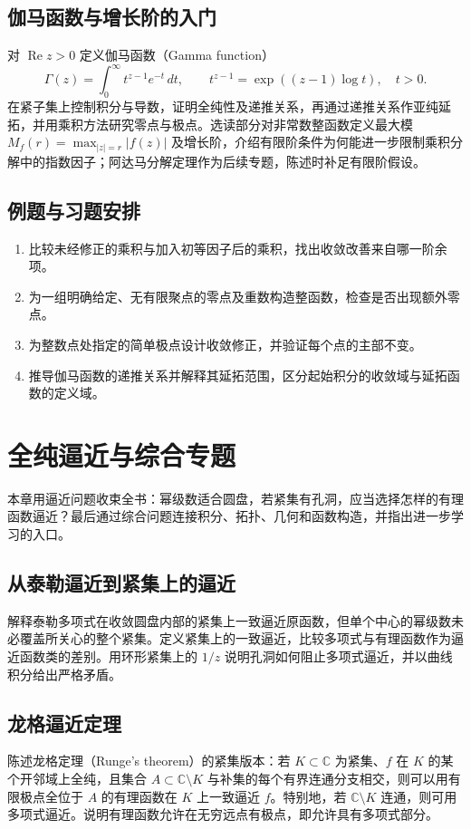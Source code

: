 \documentclass[UTF8,12pt,a4paper,fontset=fandol]{ctexbook}
\begin{document}
\section{伽马函数与增长阶的入门}
对 $\operatorname{Re}z>0$ 定义伽马函数（Gamma function）
\[
  \Gamma(z)=\int_0^{\infty}t^{z-1}e^{-t}\,dt,
  \qquad t^{z-1}=\exp((z-1)\log t),\quad t>0.
\]
在紧子集上控制积分与导数，证明全纯性及递推关系，再通过递推关系作亚纯延拓，并用乘积方法研究零点与极点。选读部分对非常数整函数定义最大模 $M_f(r)=\max_{|z|=r}|f(z)|$ 及增长阶，介绍有限阶条件为何能进一步限制乘积分解中的指数因子；阿达马分解定理作为后续专题，陈述时补足有限阶假设。

\section{例题与习题安排}
\begin{enumerate}
  \item 比较未经修正的乘积与加入初等因子后的乘积，找出收敛改善来自哪一阶余项。
  \item 为一组明确给定、无有限聚点的零点及重数构造整函数，检查是否出现额外零点。
  \item 为整数点处指定的简单极点设计收敛修正，并验证每个点的主部不变。
  \item 推导伽马函数的递推关系并解释其延拓范围，区分起始积分的收敛域与延拓函数的定义域。
\end{enumerate}

\chapter{全纯逼近与综合专题}
\label{chap:ca-approximation}

本章用逼近问题收束全书：幂级数适合圆盘，若紧集有孔洞，应当选择怎样的有理函数逼近？最后通过综合问题连接积分、拓扑、几何和函数构造，并指出进一步学习的入口。

\section{从泰勒逼近到紧集上的逼近}
解释泰勒多项式在收敛圆盘内部的紧集上一致逼近原函数，但单个中心的幂级数未必覆盖所关心的整个紧集。定义紧集上的一致逼近，比较多项式与有理函数作为逼近函数类的差别。用环形紧集上的 $1/z$ 说明孔洞如何阻止多项式逼近，并以曲线积分给出严格矛盾。

\section{龙格逼近定理}
陈述龙格定理（Runge's theorem）的紧集版本：若 $K\subset\mathbb{C}$ 为紧集、$f$ 在 $K$ 的某个开邻域上全纯，且集合 $A\subset\mathbb{C}\setminus K$ 与补集的每个有界连通分支相交，则可以用有限极点全位于 $A$ 的有理函数在 $K$ 上一致逼近 $f$。特别地，若 $\mathbb{C}\setminus K$ 连通，则可用多项式逼近。说明有理函数允许在无穷远点有极点，即允许具有多项式部分。
\end{document}
